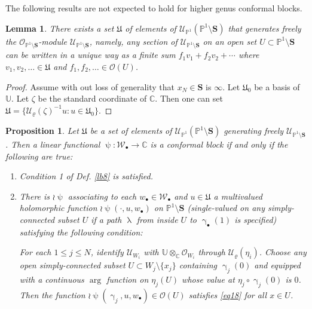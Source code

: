\documentclass[11pt,b5paper,notitlepage]{article}
\theoremstyle{definition}
\theoremstyle{plain}
\newtheorem{pp}[df]{Proposition}
\newtheorem{lm}[df]{Lemma}
\newcommand{\fk}{\mathfrak}
\newcommand{\mc}{\mathcal}
\newcommand{\scr}{\mathscr}
\newcommand{\blt}{\bullet}
\newcommand{\Ubb}{\mathbb U}
\newcommand{\Cbb}{\mathbb C}
\newcommand{\Pbb}{\mathbb P}
\newcommand{\Sbf}{\mathbf{S}}
\numberwithin{equation}{subsection}
\begin{document}

The following results are not expected to hold for higher genus conformal blocks.

\begin{lm}\label{lb53}
There exists a set $\fk U$ of elements of $\scr U_{\Pbb^1}(\Pbb^1\setminus\Sbf)$ that generates freely the $\scr O_{\Pbb^1\setminus\Sbf}$-module $\scr U_{\Pbb^1\setminus\Sbf}$, namely, any section of $\scr U_{\Pbb^1\setminus\Sbf}$ on an open set $U\subset\Pbb^1\setminus\Sbf$ can be written in a unique way as a finite sum $f_1v_1+f_2v_2+\cdots$ where $v_1,v_2,\dots\in\fk U$ and $f_1,f_2,\dots\in\scr O(U)$.
\end{lm}


\begin{proof}
Assume with out loss of generality that $x_N\in\Sbf$ is $\infty$. Let $\fk U_0$ be a basis of $\Ubb$. Let $\zeta$ be the standard coordinate of $\Cbb$. Then one can set $\fk U=\{\mc U_\varrho(\zeta)^{-1}u:u\in\fk U_0\}$.
\end{proof}










\begin{pp}\label{lb11}
Let $\fk U$ be a set of elements of $\scr U_{\Pbb^1}(\Pbb^1\setminus\Sbf)$ generating freely  $\scr U_{\Pbb^1\setminus\Sbf}$. Then a linear functional $\uppsi:\mc W_\blt\rightarrow\Cbb$ is a conformal block if and only if the following are true:
\begin{enumerate}
\item Condition 1 of Def. \ref{lb8} is satisfied.
\item There is $\wr\uppsi$ associating to each $w_\blt\in\mc W_\blt$ and $u\in\fk U$ a multivalued holomorphic function $\wr\uppsi(\cdot,u,w_\blt)$ on $\Pbb^1\setminus\Sbf$ (single-valued on any simply-connected subset $U$ if a path $\uplambda$ from inside $U$ to $\upgamma_\blt(1)$ is specified)  satisfying the following condition: 

For each $1\leq j\leq N$,  identify $\scr U_{W_i}$ with $\Ubb\otimes_\Cbb\scr O_{W_i}$ through $\mc U_\varrho(\eta_i)$.  Choose   any open simply-connected subset $U\subset W_j\setminus\{x_j\}$ containing $\upgamma_j(0)$ and equipped with a continuous $\arg$ function on $\eta_j(U)$ whose value at $\eta_j\circ\upgamma_j(0)$ is $0$. Then the function $\wr\uppsi(\upgamma_j,u,w_\blt)\in\scr O(U)$ satisfies \eqref{eq18} for all $x\in U$.
\end{enumerate}

\end{pp}
\end{document}
